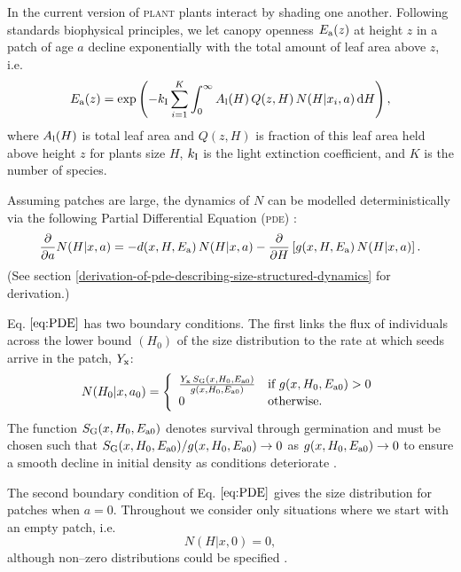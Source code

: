 \documentclass[10pt,twoside]{article}
\newcommand{\plant}{\textsc{plant}}
\begin{document}
In the current version of {\plant} plants interact by shading one another.
Following standards biophysical principles, we let canopy openness
\(E_{\rm a}(z)\) at height \(z\) in a patch of age \(a\) decline exponentially
with the total amount of leaf area above \(z\), i.e.
\begin{equation} \label{eq:light}
  E_{\rm a}(z) = \exp \left(-k_{\rm I}  \sum_{i = 1}^{K} \int_{0}^{\infty} A_{\rm l}(H) \, Q(z, H) \, N(H | x_i, a) \, {\rm d}H \right),
\end{equation}
where \(A_{\rm l}(H)\) is total leaf area and \(Q(z, H)\) is fraction of
this leaf area held above height \(z\) for plants size \(H\),
\(k_{\rm I}\) is the light extinction coefficient, and \(K\) is the number
of species.

Assuming patches are large, the dynamics of \(N\) can be modelled
deterministically via the following Partial Differential Equation (\textsc{pde})
\citep{Kohyama-1993, Deroos-1997, Moorcroft-2001}:
\begin{equation} \label{eq:PDE}
  \frac{\partial}{\partial a} N(H | x, a) = - d(x, H, E_{\rm a}) \, N(H | x, a) - \frac{\partial}{\partial H} \left[g(x, H, E_{\rm a}) \, N(H | x, a)\right].
\end{equation}
(See section \ref{derivation-of-pde-describing-size-structured-dynamics} for derivation.)

Eq. \(\ref{eq:PDE}\) has two boundary conditions. The first links the
flux of individuals across the lower bound \((H_0)\) of the size
distribution to the rate at which seeds arrive in the patch, \(Y_{\rm x}\):
\begin{equation} \label{eq:BC1}
  N(H_0 | x, a_0) = \left\{
  \begin{array}{ll}   \frac{Y_{\rm x} \, S_{\rm G} (x, H_0, E_{{\rm a}0}) }{ g(x, H_0, E_{{\rm a}0}) }  & \textrm{if } g(x, H_0, E_{{\rm a}0}) > 0 \\
  0 & \textrm{otherwise.}
  \end{array} \right.
\end{equation}
The function \(S_{\rm G} (x, H_0, E_{{\rm a}0})\) denotes survival through
germination and must be chosen such that
\(S_{\rm G} (x, H_0, E_{{\rm a}0}) / g(x, H_0, E_{{\rm a}0}) \rightarrow 0\) as
\(g(x, H_0, E_{{\rm a}0}) \rightarrow 0\) to ensure a smooth decline in
initial density as conditions deteriorate \citep{Falster-2011}.

The second boundary condition of Eq. \(\ref{eq:PDE}\) gives the size
distribution for patches when \(a = 0\). Throughout we consider only
situations where we start with an empty patch, i.e.
\begin{equation} \label{eq:BC2} N\left(H|x,0\right) = 0,
\end{equation}
although non--zero distributions could be specified
\citep[e.g][]{Kohyama-1993, Moorcroft-2001}.
\end{document}

